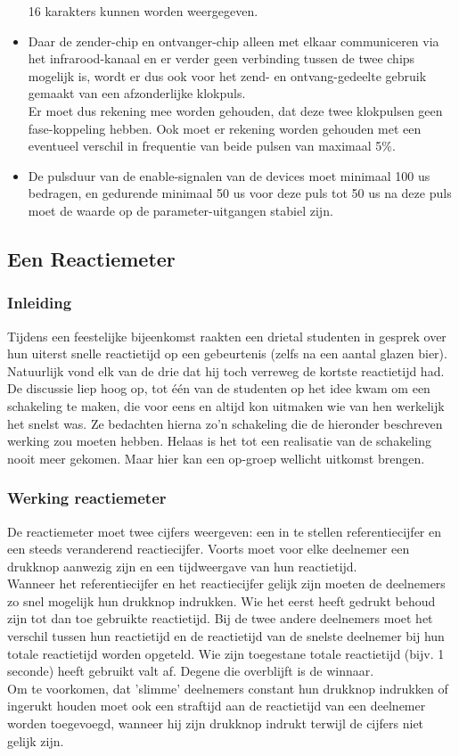 \begin{itemize}
      16 karakters kunnen worden weergegeven.
\item Daar de zender-chip en ontvanger-chip alleen met elkaar communiceren
      via het infrarood-kanaal en er verder geen verbinding tussen de twee
      chips mogelijk is, wordt er dus ook voor het zend- en ontvang-gedeelte
      gebruik gemaakt van een afzonderlijke klokpuls.\\
      Er moet dus rekening mee worden gehouden, dat deze twee klokpulsen
      geen fase-koppeling hebben.
      Ook moet er rekening worden gehouden met een eventueel verschil in
      frequentie van beide pulsen van maximaal 5\%.
\item De pulsduur van de enable-signalen van de devices moet minimaal 100 us
      bedragen, en gedurende minimaal 50 us voor deze puls tot 50 us
      na deze puls moet de waarde op de parameter-uitgangen stabiel zijn.
\end{itemize}

\subsection{Een Reactiemeter}
\subsubsection{Inleiding}
Tijdens een feestelijke bijeenkomst raakten een drietal studenten in gesprek
over hun uiterst snelle reactietijd op een gebeurtenis (zelfs na een aantal
glazen bier).
Natuurlijk vond elk van de drie dat hij toch verreweg de kortste reactietijd
had.
De discussie liep hoog op, tot \'e\'en van de studenten op het idee kwam om een
schakeling te maken, die voor eens en altijd kon uitmaken wie van hen werkelijk het snelst was.
Ze bedachten hierna zo'n schakeling die de hieronder beschreven werking
zou moeten hebben.
Helaas is het tot een realisatie van de schakeling nooit meer gekomen.
Maar hier kan een op-groep wellicht uitkomst brengen.

\subsubsection{Werking reactiemeter}
De reactiemeter moet twee cijfers weergeven: een in te stellen referentiecijfer
en een steeds veranderend reactiecijfer.
Voorts moet voor elke deelnemer een drukknop aanwezig zijn en een
tijdweergave van hun reactietijd.\\
Wanneer het referentiecijfer en het reactiecijfer gelijk zijn moeten de
deelnemers zo snel mogelijk hun drukknop indrukken.
Wie het eerst heeft gedrukt behoud zijn tot dan toe gebruikte reactietijd.
Bij de twee andere deelnemers moet het verschil tussen hun reactietijd en de
reactietijd van de snelste deelnemer bij hun totale reactietijd worden
opgeteld.
Wie zijn toegestane totale reactietijd (bijv. 1 seconde) heeft gebruikt valt af.
Degene die overblijft is de winnaar.\\
Om te voorkomen, dat 'slimme' deelnemers constant hun drukknop indrukken of
ingerukt houden moet ook een straftijd aan de reactietijd van een deelnemer
worden toegevoegd, wanneer hij zijn drukknop indrukt terwijl de cijfers
niet gelijk zijn.


